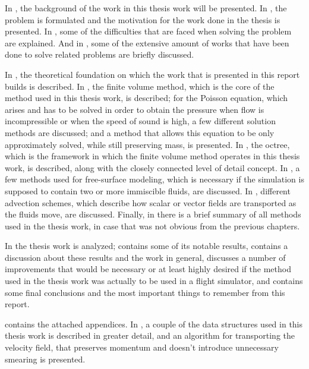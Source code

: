 
In , the background of the work in this thesis work will be presented. In 
, the problem is formulated and the motivation for the work done in the thesis is presented. In , some of the difficulties that are faced when solving the problem are explained. And in , some of the extensive amount of works that have been done to solve related problems are briefly discussed.

In , the theoretical foundation on which the work that is presented in this report builds is described. In , the finite volume method, which is the core of the method used in this thesis work, is described; for the Poisson equation, which arises and has to be solved in order to obtain the pressure when flow is incompressible or when the speed of sound is high, a few different solution methods are discussed; and a method that allows this equation to be only approximately solved, while still preserving mass, is presented. In , the octree, which is the framework in which the finite volume method operates in this thesis work, is described, along with the closely connected level of detail concept. In , a few methods used for free-surface modeling, which is necessary if the simulation is supposed to contain two or more immiscible fluids, are discussed. In , different advection schemes, which describe how scalar or vector fields are transported as the fluids move, are discussed. Finally, in  there is a brief summary of all methods used in the thesis work, in case that was not obvious from the previous chapters.

In  the thesis work is analyzed;  contains some of its notable results,  contains a discussion about these results and the work in general,  discusses a number of improvements that would be necessary or at least highly desired if the method used in the thesis work was actually to be used in a flight simulator, and  contains some final conclusions and the most important things to remember from this report.

 contains the attached appendices. In , a couple of the data structures used in this thesis work is described in greater detail, and an algorithm for transporting the velocity field, that preserves momentum and doesn't introduce unnecessary smearing is presented.

